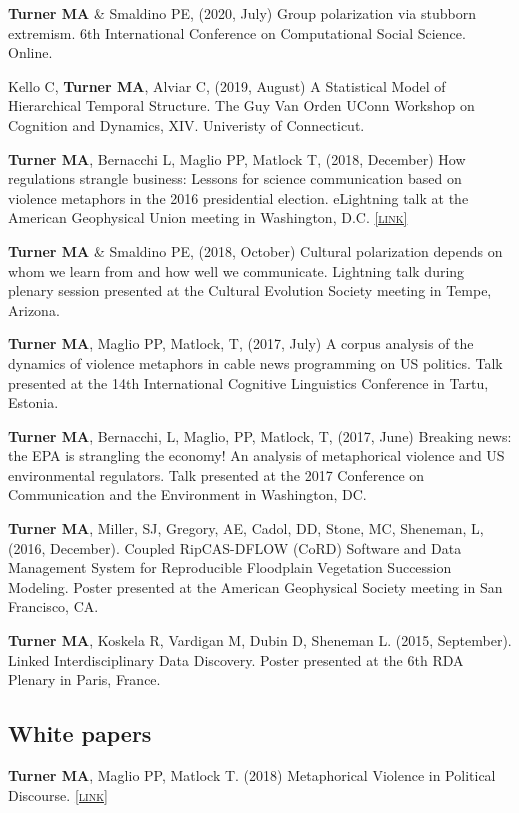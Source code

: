 \documentclass[11pt, letterpaper]{article}
\newcommand{\lurl}[1]{\href{#1}{\scriptsize\textsc{[link]}}}
\begin{document}
   \textbf{Turner MA} \& Smaldino PE, (2020, July) Group polarization via stubborn extremism. 6th International Conference on Computational Social Science. Online.

Kello C, \textbf{Turner MA}, Alviar C, (2019, August) A Statistical Model of
Hierarchical Temporal Structure. The Guy Van Orden UConn Workshop on Cognition
and Dynamics, XIV. Univeristy of Connecticut.

\textbf{Turner MA}, Bernacchi L, Maglio PP, Matlock T, (2018, December) How regulations
strangle business: Lessons for science communication based on violence metaphors in the 2016
presidential election. eLightning talk at the American Geophysical Union meeting in Washington,
D.C. \lurl{https://agu.confex.com/agu/fm18/meetingapp.cgi/Paper/451955}

\textbf{Turner MA} \& Smaldino PE, (2018, October) Cultural polarization depends on whom we learn from and how well we communicate. Lightning talk during plenary session presented at the Cultural Evolution Society meeting in Tempe, Arizona.

\textbf{Turner MA}, Maglio PP, Matlock, T, (2017, July) A corpus analysis of the dynamics of violence metaphors in cable news programming on US politics. Talk presented at the 14th International Cognitive Linguistics Conference in Tartu, Estonia.

\textbf{Turner MA}, Bernacchi, L, Maglio, PP, Matlock, T, (2017, June) Breaking
news: the EPA is strangling the economy! An analysis of metaphorical violence
and US environmental regulators. Talk presented at the 2017 Conference on
Communication and the Environment in Washington, DC.

\textbf{Turner MA}, Miller, SJ, Gregory, AE, Cadol, DD, Stone, MC, Sheneman, L, (2016, December). Coupled RipCAS-DFLOW (CoRD) Software and Data Management System for Reproducible Floodplain Vegetation Succession Modeling. Poster presented at the American Geophysical Society meeting in San Francisco, CA.

\textbf{Turner MA}, Koskela R, Vardigan M, Dubin D, Sheneman L. (2015, September). Linked Interdisciplinary Data Discovery. Poster presented at the 6th RDA Plenary in Paris, France. 


\subsection{White papers}

  \textbf{Turner MA}, Maglio PP, Matlock T. (2018) Metaphorical Violence in Political Discourse. 
  \lurl{https://doi.org/10.31235/osf.io/t8yg9}
\end{document}
